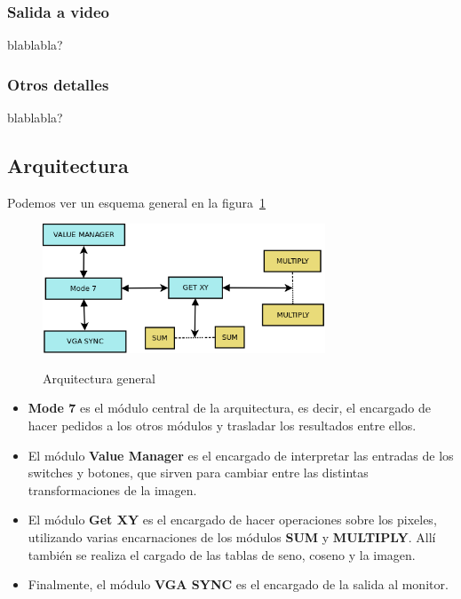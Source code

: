 \subsubsection{Salida a video}
blablabla?

\subsubsection{Otros detalles}
blablabla?

\subsection{Arquitectura}
Podemos ver un esquema general en la figura~\ref{fig:arquitectura}
\begin{figure}[h!]
 \caption{Arquitectura general}
 \centering
   \includegraphics[width=0.75\textwidth]{arquitectura.png}
   \label{fig:arquitectura}
\end{figure} 

\begin{itemize}
\item \textbf{Mode 7} es el módulo central de la arquitectura, es decir, el encargado de hacer pedidos a los otros módulos y trasladar los resultados entre ellos. 
\item El módulo \textbf{Value Manager} es el encargado de interpretar las entradas de los switches y botones, que sirven para cambiar entre las distintas transformaciones de la imagen.
\item El módulo \textbf{Get XY} es el encargado de hacer operaciones sobre los pixeles, utilizando varias encarnaciones de los módulos \textbf{SUM} y \textbf{MULTIPLY}. Allí también se realiza el cargado de las tablas de seno, coseno y la imagen.
\item Finalmente, el módulo \textbf{VGA SYNC} es el encargado de la salida al monitor.
\end{itemize}